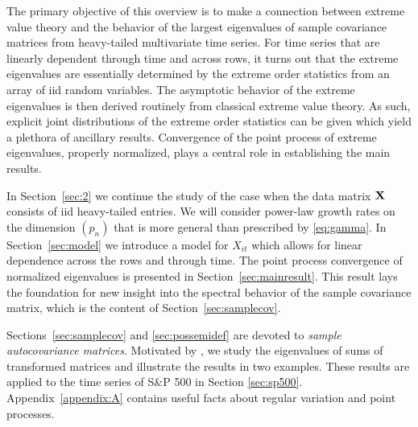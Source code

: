 The primary objective of this overview  is to make a connection between extreme value theory and the behavior of the largest eigenvalues of sample covariance matrices from heavy-tailed multivariate time series.  For time series that are linearly dependent through time and across rows, it turns out that the extreme eigenvalues are essentially determined by the extreme order statistics from an array of iid random variables.  The asymptotic behavior of the extreme eigenvalues is then derived routinely from classical extreme value theory.  As such, explicit joint distributions of the extreme order statistics can be given which yield a plethora of ancillary results.  
Convergence of the point process of extreme eigenvalues, properly normalized, plays a central role in establishing the main results.
\par
In Section~\ref{sec:2} we continue the study of the case when the data matrix ${\mathbf X}$ consists of iid heavy-tailed entries.  We will consider power-law growth rates on the dimension $(p_n)$ that is more general than prescribed by \eqref{eq:gamma}.
In Section~\ref{sec:model} we introduce a model for $X_{it}$ which allows for linear dependence across the rows and through time.
The point process convergence of normalized eigenvalues is presented in Section~\ref{sec:mainresult}.
This result lays the foundation for new insight into the spectral behavior of the sample covariance matrix, which is the content of Section~\ref{sec:samplecov}.

Sections~\ref{sec:samplecov} and \ref{sec:possemidef} are devoted to {\em sample autocovariance matrices}.  Motivated by \cite{lam:yao}, we study the eigenvalues of sums of transformed matrices and illustrate the results in two examples. These results are applied to the time series of S\&P 500 in Section \ref{sec:sp500}.
Appendix~\ref{appendix:A} contains useful facts about regular variation and point processes.




